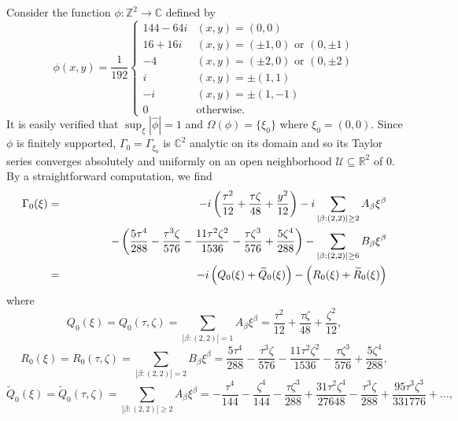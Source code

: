 \documentclass[11pt]{article}
\newenvironment{example}
  {\pushQED{\qed}\renewcommand{\qedsymbol}{$\triangle$}\examplex}
  {\popQED\endexamplex}
\theoremstyle{remark}
\newcommand{\lp}{\left(}
\newcommand{\rp}{\right)}
\newcommand{\f}[2]{\frac{#1}{#2}}
\begin{document}
\begin{example}\normalfont
Consider the function $\phi : \mathbb{Z}^2 \to \mathbb{C}$ defined by 
\begin{equation*}
    \phi(x,y) =
    \frac{1}{192}
    \begin{cases}
    144 - 64i &(x,y) = (0,0)\\
    16 + 16i &(x,y) = (\pm 1, 0)\mbox{ or }(0,\pm 1)\\
    -4        &(x,y) = (\pm 2,0)\mbox{ or }(0,\pm 2)\\
    i   &(x,y) = \pm(1,1)\\
    -i   &(x,y) = \pm(1,-1)\\
    0& \text{otherwise}.
    \end{cases}
\end{equation*}
It is easily verified that $\sup_{\xi}|\widehat{\phi}|=1$ and $\Omega(\phi) = \{\xi_0 \}$ where $\xi_0=(0,0)$. Since $\phi$ is finitely supported, $\Gamma_{0}=\Gamma_{\xi_0}$ is $\mathbb{C}^2$ analytic on its domain and so its Taylor series converges absolutely and uniformly on an open neighborhood $\mathcal{U}\subseteq \mathbb{R}^2$ of $0$. By a straightforward computation, we find
\begin{eqnarray*}
\Gamma_{0}(\xi)
&=& 
-i\lp \frac{\tau^2}{12} +\frac{\tau\zeta}{48} + \frac{y^2}{12}   \rp
-i \sum_{|\beta:(2,2)|\geq 2}A_\beta \xi^\beta\\
&& 
\hspace{1.3cm}-\lp \frac{5\tau^4}{288} -\f{\tau^3\zeta}{576} -\frac{11\tau^2\zeta^2}{1536}-\frac{\tau\zeta^3}{576} + \frac{5\zeta^4}{288}  \rp 
- \sum_{|\beta:(2,2)|\geq 6}B_\beta \xi^\beta\\
&=&-i\lp Q_{0}(\xi)+\widetilde{Q}_{0}(\xi)\rp-\lp R_0(\xi)+\widetilde{R}_0(\xi)\rp
\end{eqnarray*}
where
\begin{equation*}
Q_{0}(\xi)=Q_0(\tau,\zeta)=\sum_{|\beta:(2,2)|=1}A_\beta \xi^\beta=\frac{\tau^2}{12} +\frac{\tau\zeta}{48} + \frac{\zeta^2}{12},
\end{equation*}
\begin{equation*}
R_{0}(\xi)=R_0(\tau,\zeta)=\sum_{|\beta:(2,2)|=2}B_\beta\xi^\beta
= \frac{5\tau^4}{288} -\f{\tau^3\zeta}{576} -\frac{11\tau^2\zeta^2}{1536}-\frac{\tau\zeta^3}{576} + \frac{5\zeta^4}{288}, 
\end{equation*}
\begin{equation*}
\widetilde{Q}_{0}(\xi)=\widetilde{Q}_0(\tau,\zeta)
= \sum_{|\beta:(2,2)|\geq 2}A_\beta \xi^\beta= - \frac{\tau^4}{144}  - \frac{\zeta^4}{144} - \frac{\tau\zeta^3}{288} + \frac{31 \tau^2\zeta^4}{27648} - \frac{\tau^3\zeta}{288} + \frac{95\tau^3\zeta^3}{331776} + \dots,

\end{equation*}
\end{example}
\end{document}
